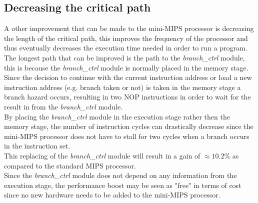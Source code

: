 \documentclass[10pt]{article}
\begin{document}
\subsection{Decreasing the critical path}
A other improvement that can be made to the mini-MIPS processor is decreasing the length of the critical path, this improves the frequency of the processor and thus eventually decreases the execution time needed in order to run a program.\\
The longest path that can be improved is the path to the \textit{branch\_ctrl} module, this is because the \textit{branch\_ctrl} module is normally placed in the memory stage.\\ 
Since the decision to continue with the current instruction address or load a new instruction address (e.g. branch taken or not) is taken in the memory stage a branch hazard occurs, resulting in two NOP instructions in order to wait for the result in from the \textit{branch\_ctrl} module.\\ %
By placing the \textit{branch\_ctrl} module in the execution stage rather then the memory stage, the number of instruction cycles can drastically decrease since the mini-MIPS processor does not have to stall for two cycles when a branch occurs in the instruction set.\\ This replacing of the \textit{branch\_ctrl} module will result in a gain of $ \approx 10.2 \% $ as compared to the standard MIPS processor.\\
Since the \textit{branch\_ctrl} module does not depend on any information from the execution stage, the performance boost may be seen as "free" in terms of cost since no new hardware needs to be added to the mini-MIPS processor. 


\end{document}
